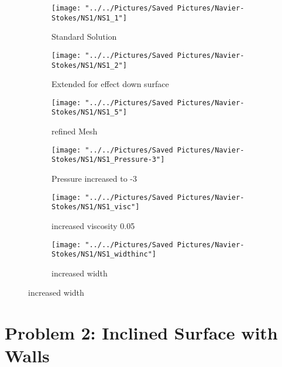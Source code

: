 \documentclass{article}
\begin{document}
\begin{figure}[h!]
\begin{subfigure}{0.4\linewidth}
	\centering
	\texttt{[image: "../../Pictures/Saved Pictures/Navier-Stokes/NS1/NS1\_1"]}
	\caption{Standard Solution}
	\label{fig:ns11}
\end{subfigure}
\begin{subfigure}{0.4\linewidth}
	\centering
	\texttt{[image: "../../Pictures/Saved Pictures/Navier-Stokes/NS1/NS1\_2"]}
	\caption{Extended for effect down surface}
	\label{fig:ns12}
\end{subfigure}
\begin{subfigure}{0.4\linewidth}
	\centering
	\texttt{[image: "../../Pictures/Saved Pictures/Navier-Stokes/NS1/NS1\_5"]}
	\caption{refined Mesh}
	\label{fig:ns15}
\end{subfigure}
\begin{subfigure}{0.4\linewidth}
	\centering
	\texttt{[image: "../../Pictures/Saved Pictures/Navier-Stokes/NS1/NS1\_Pressure-3"]}
	\caption{Pressure increased to -3}
	\label{fig:ns1pressure-3}
\end{subfigure}
\begin{subfigure}{0.4\linewidth}
	\centering
	\texttt{[image: "../../Pictures/Saved Pictures/Navier-Stokes/NS1/NS1\_visc"]}
	\caption{increased viscosity 0.05}
	\label{fig:ns1visc}
\end{subfigure}
\qquad\qquad\qquad
\begin{subfigure}{0.4\linewidth}
	\centering
	\texttt{[image: "../../Pictures/Saved Pictures/Navier-Stokes/NS1/NS1\_widthinc"]}
	\caption{increased width}
	\label{fig:ns1widthinc}
\end{subfigure}
\end{figure}
	\section{Problem 2: Inclined Surface with Walls}
\end{document}
